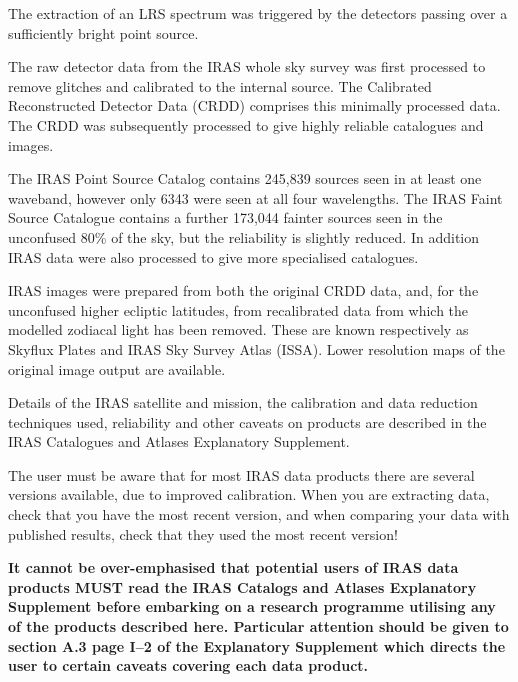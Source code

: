 \documentclass[11pt,nolof,noabs]{starlink}
\begin{document}
The extraction of an LRS spectrum was triggered by the detectors passing over a
sufficiently bright point source.

The raw detector data from the IRAS whole sky survey was first processed to
remove glitches and calibrated to the internal source. The Calibrated
Reconstructed Detector Data (CRDD) comprises this minimally processed data. The
CRDD was subsequently processed to give highly reliable catalogues and images.

The IRAS Point Source Catalog contains 245,839 sources seen in at
least one waveband, however only 6343 were seen at all four wavelengths.
The IRAS Faint Source Catalogue contains a further 173,044 fainter sources
seen in the unconfused 80\% of the sky, but the reliability is slightly reduced.
In addition IRAS data were also processed to give more specialised catalogues.

IRAS images were prepared from both the original CRDD data, and, for the
unconfused higher ecliptic latitudes, from recalibrated data from which the
modelled zodiacal light has been removed. These are known respectively as
Skyflux Plates and IRAS Sky Survey Atlas (ISSA). Lower resolution maps of the
original image output are available.

Details of the IRAS satellite and mission, the calibration and data
reduction techniques used, reliability and other caveats on products are
described in the IRAS Catalogues and Atlases Explanatory Supplement.

The user must be aware that for most IRAS data products there are several
versions available, due to improved calibration. When you are extracting data,
check that you have the most recent version, and when comparing your data with
published results, check that they used the most recent version!

\textbf{It cannot be over-emphasised that potential users of IRAS data products
MUST read the IRAS Catalogs and Atlases Explanatory Supplement before embarking
on a research programme utilising any of the products described here.
Particular attention should be given to section A.3 page I--2 of the Explanatory
Supplement which directs the user to certain caveats covering each data
product.}
\end{document}
